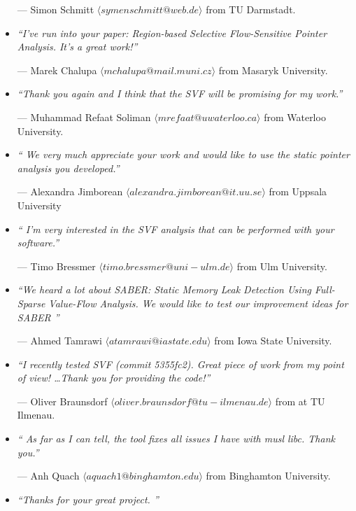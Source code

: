 \documentclass[12pt]{article}
\begin{document}
\begin{itemize}
\qquad --- Simon Schmitt  $\langle symenschmitt@web.de\rangle$ from TU Darmstadt.
 
\item
 \emph{``I've run into your paper: Region-based Selective Flow-Sensitive Pointer Analysis. It's a great work!''}
 
\qquad --- Marek Chalupa $\langle mchalupa@mail.muni.cz \rangle$ from Masaryk University.
 
 
\item
 \emph{``Thank you again and I think that the SVF will be promising for my work.''}
 
\qquad --- 	Muhammad Refaat Soliman  $\langle mrefaat@uwaterloo.ca \rangle$ from Waterloo University.


\item
 \emph{`` We very much appreciate your work and would like to use the static pointer analysis you developed.''}
 
\qquad --- 	 Alexandra Jimborean  $\langle alexandra.jimborean@it.uu.se \rangle$ from Uppsala University
 
 
\item
\emph{`` I'm very interested in the SVF analysis that can be performed with your software.''}

\qquad --- 	 Timo Bressmer  $\langle timo.bressmer@uni-ulm.de \rangle$ from Ulm University.


\item
\emph{``We heard a lot about SABER: Static Memory Leak Detection Using Full-Sparse Value-Flow Analysis. We would like to test our improvement ideas for SABER ''}

\qquad --- 	Ahmed Tamrawi  $\langle atamrawi@iastate.edu \rangle$ from Iowa State University.

\item
\emph{``I recently tested SVF (commit 5355fc2). Great piece of work from my point of view! \dots Thank you for providing the code!''}

\qquad --- Oliver Braunsdorf $\langle oliver.braunsdorf@tu-ilmenau.de \rangle$ from at TU Ilmenau.

\item
\emph{`` As far as I can tell, the tool fixes all issues I have with musl libc. Thank you.''}

\qquad --- 	Anh Quach $\langle aquach1@binghamton.edu  \rangle$ from Binghamton University.

\item
\emph{``Thanks for your great project. ''}


\end{itemize}
\end{document}
